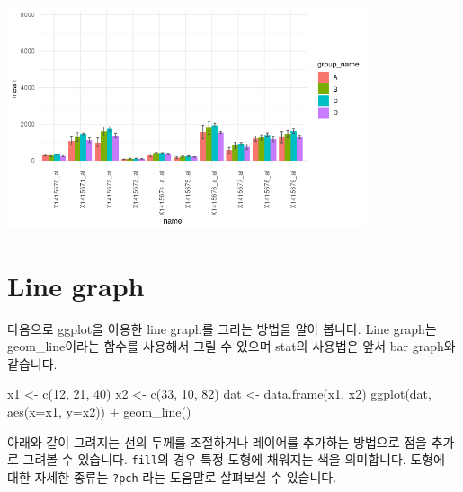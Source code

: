 \documentclass[
]{book}
\newenvironment{Shaded}{\begin{snugshade}}{\end{snugshade}}
\newcommand{\AttributeTok}[1]{\textcolor[rgb]{0.77,0.63,0.00}{#1}}
\newcommand{\DecValTok}[1]{\textcolor[rgb]{0.00,0.00,0.81}{#1}}
\newcommand{\FunctionTok}[1]{\textcolor[rgb]{0.00,0.00,0.00}{#1}}
\newcommand{\NormalTok}[1]{#1}
\newcommand{\OtherTok}[1]{\textcolor[rgb]{0.56,0.35,0.01}{#1}}
\newcommand{\SpecialCharTok}[1]{\textcolor[rgb]{0.00,0.00,0.00}{#1}}
\begin{document}
\includegraphics[width=4.16667in,height=\textheight]{images/07/barploterrorbar.png}

\hypertarget{line-graph}{%
\section{Line graph}\label{line-graph}}

다음으로 ggplot을 이용한 line graph를 그리는 방법을 알아 봅니다. Line graph는 geom\_line이라는 함수를 사용해서 그릴 수 있으며 stat의 사용법은 앞서 bar graph와 같습니다.

\begin{Shaded}
\begin{Highlighting}[]
\NormalTok{x1 }\OtherTok{\textless{}{-}} \FunctionTok{c}\NormalTok{(}\DecValTok{12}\NormalTok{, }\DecValTok{21}\NormalTok{, }\DecValTok{40}\NormalTok{)}
\NormalTok{x2 }\OtherTok{\textless{}{-}} \FunctionTok{c}\NormalTok{(}\DecValTok{33}\NormalTok{, }\DecValTok{10}\NormalTok{, }\DecValTok{82}\NormalTok{)}
\NormalTok{dat }\OtherTok{\textless{}{-}} \FunctionTok{data.frame}\NormalTok{(x1, x2)}
\FunctionTok{ggplot}\NormalTok{(dat, }\FunctionTok{aes}\NormalTok{(}\AttributeTok{x=}\NormalTok{x1, }\AttributeTok{y=}\NormalTok{x2)) }\SpecialCharTok{+}
  \FunctionTok{geom\_line}\NormalTok{()}
\end{Highlighting}
\end{Shaded}

아래와 같이 그려지는 선의 두께를 조절하거나 레이어를 추가하는 방법으로 점을 추가로 그려볼 수 있습니다. \texttt{fill}의 경우 특정 도형에 채워지는 색을 의미합니다. 도형에 대한 자세한 종류는 \texttt{?pch} 라는 도움말로 살펴보실 수 있습니다.
\end{document}
